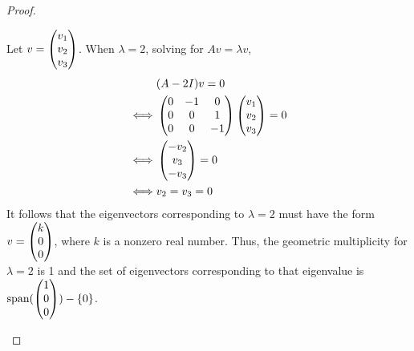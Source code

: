\begin{proof}
\begin{enumerate}[(i)]
              Let $v=\begin{pmatrix} v_1\\ v_2\\ v_3\end{pmatrix}$.
              When $\lambda=2$, solving for $Av=\lambda v$,
              \[
                  \begin{aligned}
                       & (A-2I)v=0                    \\
                      \iff
                       & \begin{pmatrix}
                            0 & -1 & 0\\
                            0 & 0 & 1\\
                            0 & 0 & -1
                       \end{pmatrix}\begin{pmatrix} v_1\\ v_2\\ v_3\end{pmatrix}=0\\
                       \iff 
                       &\begin{pmatrix} -v_2\\ v_3\\ -v_3\end{pmatrix}=0\\
                       \iff
                       &v_2=v_3=0
                  \end{aligned}
              \]
              It follows that the eigenvectors corresponding to $\lambda=2$ must have the form $v=\begin{pmatrix} k\\ 0\\ 0\end{pmatrix}$, where $k$ is a nonzero real number.
              Thus, the geometric multiplicity for $\lambda=2$ is 1 and the set of eigenvectors corresponding to that eigenvalue is $\textnormal{span}(\begin{pmatrix} 1\\ 0\\ 0\end{pmatrix})-\{0\}$.


\end{enumerate}
\end{proof}
